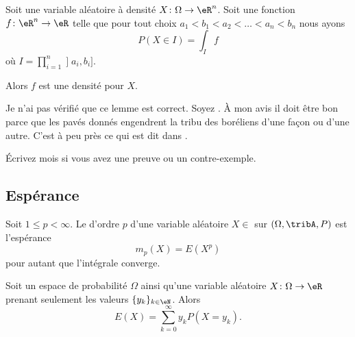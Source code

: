 \begin{lemma}       \label{LEMooIVIWooUUVStW}
	Soit une variable aléatoire à densité \( X\colon \Omega\to \eR^n\). Soit une fonction \( f\colon \eR^n\to \eR\) telle que pour tout choix \( a_1<b_1<a_2<\ldots <a_n<b_n\) nous ayons
	\begin{equation}
		P(X\in I)=\int_I f
	\end{equation}
	où \( I=\prod_{i=1}^n\mathopen] a_i , b_i \mathclose]\).

	Alors \( f\) est une densité pour \( X\).

	\begin{probleme}		\label{PROBooAHJSooWUuJhb}
		Je n'ai pas vérifié que ce lemme est correct. Soyez . À mon avis il doit être bon parce que les pavés donnés engendrent la tribu des boréliens d'une façon ou d'une autre. C'est à peu près ce qui est dit dans \cite{BIBooMECWooHQJweh}.

		Écrivez mois si vous avez une preuve ou un contre-exemple.
	\end{probleme}
\end{lemma}


\subsection{Espérance}

\begin{definition}
	Soit \( 1\leq p<\infty\). Le  d'ordre \( p\) d'une variable aléatoire \( X\in\) sur \( (\Omega,\tribA,P)\) est l'espérance
	\begin{equation}
		m_p(X)=E(X^p)
	\end{equation}
	pour autant que l'intégrale converge.
\end{definition}

\begin{lemma}        \label{LEMooEHTYooWmMAgf}
	Soit un espace de probabilité \( \Omega\) ainsi qu'une variable aléatoire \( X\colon \Omega\to \eR\) prenant seulement les valeurs \( \{ y_k \}_{k\in \eN}\). Alors
	\begin{equation}
		E(X)=\sum_{k=0}^{\infty}y_kP(X=y_k).
	\end{equation}
\end{lemma}

